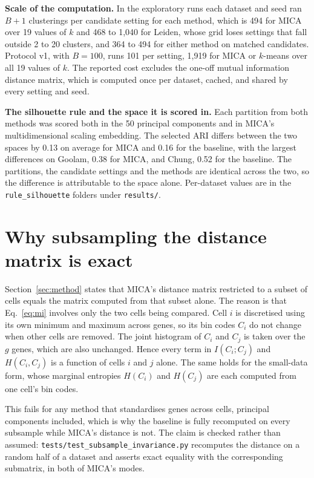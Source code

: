 \textbf{Scale of the computation.} In the exploratory runs each dataset and seed ran $B+1$ clusterings per
candidate setting for each method, which is 494 for MICA over 19 values of $k$ and 468 to
1,040 for Leiden, whose grid loses settings that fall outside 2 to 20 clusters, and 364 to 494
for either method on matched candidates. Protocol v1, with $B = 100$, runs 101 per setting, 1,919 for MICA or $k$-means over all 19 values of $k$. The reported cost excludes the one-off mutual information
distance matrix, which is computed once per dataset, cached, and shared by every setting
and seed.


\textbf{The silhouette rule and the space it is scored in.} Each partition from both
methods was scored both in the 50 principal components and in MICA's multidimensional
scaling embedding. The selected ARI differs between the two spaces by 0.13 on average
for MICA and 0.16 for the baseline, with the largest differences on Goolam, 0.38 for
MICA, and Chung, 0.52 for the baseline. The partitions, the candidate settings and the
methods are identical across the two, so the difference is attributable to the space
alone. Per-dataset values are in the \texttt{rule\_silhouette} folders under
\texttt{results/}.

\section{Why subsampling the distance matrix is exact}\label{app:exact}
Section~\ref{sec:method} states that MICA's distance matrix restricted to a subset of
cells equals the matrix computed from that subset alone. The reason is that
Eq.~\ref{eq:mi} involves only the two cells being compared. Cell $i$ is discretised using
its own minimum and maximum across genes, so its bin codes $C_i$ do not change when other
cells are removed. The joint histogram of $C_i$ and $C_j$ is taken over the $g$ genes, which
are also unchanged. Hence every term in $I(C_i; C_j)$ and $H(C_i, C_j)$ is a function of
cells $i$ and $j$ alone. The same holds for the small-data form, whose
marginal entropies $H(C_i)$ and $H(C_j)$ are each computed from one cell's bin codes.

This fails for any method that standardises genes across cells, principal components
included, which is why the baseline is fully recomputed on every subsample while MICA's
distance is not. The claim is checked rather than assumed:
\texttt{tests/test\_subsample\_invariance.py} recomputes the distance on a random half of
a dataset and asserts exact equality with the corresponding submatrix, in both of MICA's
modes.

